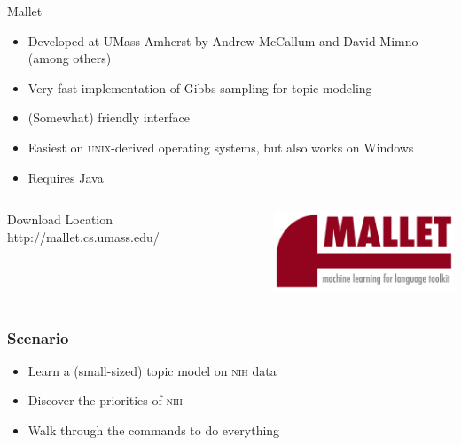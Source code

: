 

\begin{frame}{Mallet}

\begin{itemize}
  \item Developed at UMass Amherst by Andrew McCallum and David Mimno (among others)
  \item Very fast implementation of Gibbs sampling for topic modeling
  \item (Somewhat) friendly interface
  \item Easiest on \textsc{unix}-derived operating systems, but also works on Windows
  \item Requires Java
\end{itemize}

\begin{columns}
\begin{block}{Download Location}
  http://mallet.cs.umass.edu/
\end{block}
\includegraphics[width=.9\linewidth]{topic_models/mallet}
\end{columns}
\end{frame}


\begin{frame}
  \frametitle{Scenario}

  \begin{itemize}
    \item Learn a (small-sized) topic model on \textsc{nih} data
    \item Discover the priorities of \textsc{nih}
    \item Walk through the commands to do everything
  \end{itemize}
\end{frame}

